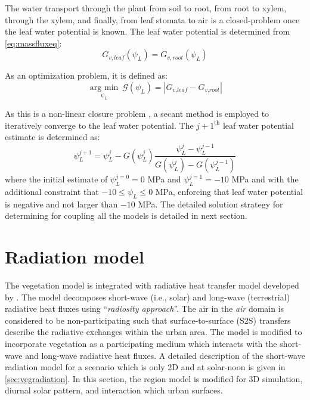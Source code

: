 The water transport through the plant from soil to root, from root to xylem, through the xylem, and finally, from leaf stomata to air is a closed-problem once the leaf water potential is known. The leaf water potential is determined from \cref{eq:massfluxeq}:
\begin{equation}
G_{v,leaf}(\psi_L) = G_{v,root} (\psi_L)
\end{equation}

As an optimization problem, it is defined as:
\begin{equation}
\mathop {\mathrm{arg\ min} }\limits_{\psi_L}~\mathcal{G}(\psi _L) = \left| {{G_{\textit{v,leaf}}} - {G_{\textit{v,root}}}} \right|
\end{equation}

As this is a non-linear closure problem \citep{Manoli2014},  a secant method is employed to iteratively converge to the leaf water potential. The $j+1^\mathrm{th}$ leaf water potential estimate is determined as:
\begin{equation}
\psi_L^{j+1} = \psi_L^{j} - G(\psi_L^j) \frac{\psi_L^j - \psi_L^{j-1}}{G\left(\psi_L^j\right) - G\left(\psi_L^{j-1}\right) }
\end{equation}
where the initial estimate of $\psi_L^{j=0} = 0$ MPa and $\psi_L^{j=1} = -10$ MPa and with the additional constraint that $-10 \le \psi_L \le 0$ MPa, enforcing that leaf water potential is negative and not larger than $-10$ MPa. The detailed solution strategy for determining for coupling all the models is detailed in next section.

\section{Radiation model}
\label{sec:radiationmodel}

The vegetation model is integrated with radiative heat transfer model developed by \cite{Kubilay2018}. The model decomposes short-wave (i.e., solar) and long-wave (terrestrial) radiative heat fluxes using ``\textit{radiosity approach}''. The air in the \textit{air} domain is considered to be non-participating such that surface-to-surface (S2S) transfers describe the radiative exchanges within the urban area. The model is modified to incorporate vegetation as a participating medium which interacts with the short-wave and long-wave radiative heat fluxes. A detailed description of the short-wave radiation model for a scenario which is only 2D and at solar-noon is given in \cref{sec:vegradiation}. In this section, the region model is modified for 3D simulation, diurnal solar pattern, and interaction which urban surfaces.

